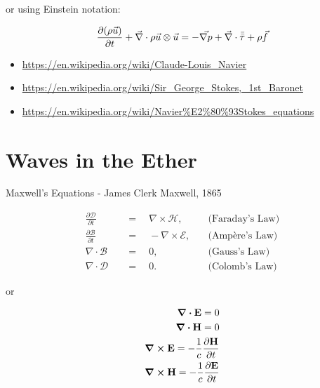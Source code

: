 \documentclass[12pt]{article}
\begin{document}
or using Einstein notation:

\begin{equation*}   \pdv{(\rho \vec{u})}{t}+\vec{\nabla}\cdot\rho\vec{u}\otimes\vec{u} = -\vec{\nabla p}+\vec{\nabla}\cdot\Bar{\Bar{\tau}}+\rho\vec{f}  \end{equation*}

\begin{itemize}
	\item \url{https://en.wikipedia.org/wiki/Claude-Louis_Navier}
	\item \url{https://en.wikipedia.org/wiki/Sir_George_Stokes,_1st_Baronet}
	\item \url{https://en.wikipedia.org/wiki/Navier%E2%80%93Stokes_equations}
\end{itemize}

\newpage


\section{Waves in the Ether}
	
Maxwell's Equations - James Clerk Maxwell, 1865

\vspace{2em}

\begin{equation*}
	\begin{aligned}
		\frac{\partial\mathcal{D}}{\partial t} \quad & = \quad \nabla\times\mathcal{H},   & \quad \text{(Faraday's Law)} \\[5pt]
		\frac{\partial\mathcal{B}}{\partial t} \quad & = \quad -\nabla\times\mathcal{E},  & \quad \text{(Ampère's Law)}   \\[5pt]
		\nabla\cdot\mathcal{B}                 \quad & = \quad 0,                         & \quad \text{(Gauss's Law)}   \\[5pt]
		\nabla\cdot\mathcal{D}                 \quad & = \quad 0.                         & \quad \text{(Colomb's Law)}
	\end{aligned}
\end{equation*}

or

\begin{equation*}
	\begin{aligned}
\div \mathbf{E} = 0 \\
\div \mathbf{H} = 0 \\
\curl{\mathbf{E}} = - \frac{1}{c} \frac{\partial \mathbf{H}}{\partial t} \\
\curl{\mathbf{H}} = - \frac{1}{c} \frac{\partial \mathbf{E}}{\partial t} \\
	\end{aligned}
\end{equation*}
\end{document}
